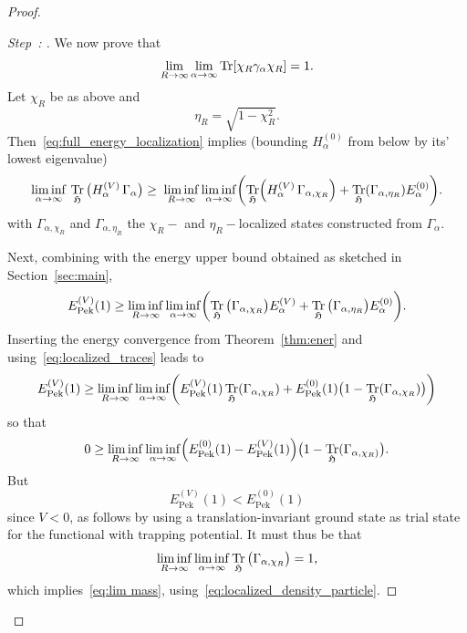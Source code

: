 \documentclass[10pt]{amsart}
\theoremstyle{definition}\newtheorem{defi}[theo]{Definition}\newtheorem{rema}[theo]{Remark}\newtheorem{exam}[theo]{Example}\newtheorem{exem}[theo]{Example}\newtheorem{nota}[theo]{Notation}
\DeclareMathOperator{\Tr}{Tr}
\DeclareMathOperator{\Pek}{Pek}
\newcommand{\gH}{\mathfrak{H}}
\newcommand{\1}{\mathds{1}}
\renewcommand*{\to}{\mathchoice{\longrightarrow}{\rightarrow}{\rightarrow}{\rightarrow}}
\newcounter{setofstep}
\newcounter{step}[setofstep]
\newenvironment{step}[1][]{\refstepcounter{step}\begin{proof}[{Step~\thestep\if#1\empty\else: #1\fi}]}{\let\qed\relax\end{proof}}
\let\originalleft\left
\let\originalright\right
\renewcommand{\left}{\mathopen{}\mathclose\bgroup\originalleft}
\renewcommand{\right}{\aftergroup\egroup\originalright}
\begin{document}
\begin{proof}
\begin{step}
We now prove that
\begin{equation}\label{eq:lim mass}
\lim_{R\to \infty}\lim_{\alpha \to \infty} \Tr \left[\chi_R \gamma_\alpha \chi_R \right] = 1.
\end{equation}
Let $\chi_R$ be as above and
\begin{equation*}
\eta_R = \sqrt{1-\chi_R^2}.
\end{equation*}
Then~\eqref{eq:full_energy_localization} implies (bounding $H_\alpha^{(0)}$ from below by its' lowest eigenvalue)
\begin{equation*}
\liminf_{\alpha\to\infty}\, \Tr_{ \gH}\big(H_\alpha^{(V)}\, \Gamma_\alpha\big)
\ge\; \liminf_{R\to\infty} \liminf_{\alpha\to\infty} \left(\Tr_{ \gH}\left(H_\alpha^{(V)}\, \Gamma_{\alpha,\chi_R}\right) +\Tr_{ \gH} \left(\Gamma_{\alpha,\eta_R}\right) E^{(0)}_\alpha\right).
\end{equation*}
with $\Gamma_{\alpha,\chi_R}$ and $ \Gamma_{\alpha,\eta_R}$ the $\chi_R-$ and $\eta_R-$localized states constructed from $\Gamma_\alpha$.

Next, combining with the energy upper bound obtained as sketched in Section~\ref{sec:main},
\begin{equation*}
E_{\Pek}^{(V)}(1) \geq \liminf_{R\to\infty} \liminf_{\alpha\to\infty} \left(\Tr_{ \gH} \big(\Gamma_{\alpha,\chi_R}\big) E^{(V)}_\alpha + \Tr_{ \gH} \big(\Gamma_{\alpha,\eta_R}\big) E^{(0)}_\alpha \right).
\end{equation*}
Inserting the energy convergence from Theorem~\ref{thm:ener} and using~\eqref{eq:localized_traces} leads to
\begin{equation*}
E_{\Pek}^{(V)}(1) \geq \liminf_{R\to\infty} \liminf_{\alpha\to\infty} \left(E_{\Pek}^{(V)}(1)\Tr_{ \gH} \left(\Gamma_{\alpha,\chi_R}\right) + E_{\Pek}^{(0)}(1)\bigl(1-\Tr_{ \gH} \left(\Gamma_{\alpha,\chi_R}\right)\bigr)\right)
\end{equation*}
so that
\begin{equation*}
0 \geq \liminf_{R\to\infty} \liminf_{\alpha\to\infty}\left(E_{\Pek}^{(0)}(1) - E_{\Pek}^{(V)}(1)\right) \bigl(1-\Tr_{ \gH} (\Gamma_{\alpha,\chi_R)}\bigr).
\end{equation*}
But
\begin{equation*}
E_{\Pek}^{(V)}(1) < E_{\Pek}^{(0)}(1)
\end{equation*}
since $V < 0$, as follows by using a translation-invariant ground state as trial state for the functional with trapping potential. It must thus be that
\begin{equation*}
\liminf_{R\to\infty} \liminf_{\alpha\to\infty} \Tr_{ \gH} \big(\Gamma_{\alpha,\chi_R}\big) = 1,
\end{equation*}
which implies~\eqref{eq:lim mass}, using~\eqref{eq:localized_density_particle}.
\end{step}


\end{proof}
\end{document}
